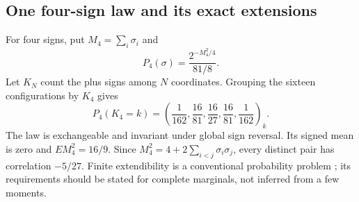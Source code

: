 \subsection{One four-sign law and its exact extensions}
\label{fin:four-law}

For four signs, put \(M_4=\sum_i\sigma_i\) and
\[
 P_4(\sigma)=\frac{2^{-M_4^2/4}}{81/8}.
\]
Let \(K_N\) count the plus signs among \(N\) coordinates.  Grouping
the sixteen configurations by \(K_4\) gives
\begin{equation}\label{fin:target}
 P_4(K_4=k)=
 \left(\frac1{162},\frac{16}{81},\frac{16}{27},
                    \frac{16}{81},\frac1{162}\right)_k .
\end{equation}
The law is exchangeable and invariant under global sign reversal.
Its signed mean is zero and \(E M_4^2=16/9\).
Since \(M_4^2=4+2\sum_{i<j}\sigma_i\sigma_j\),
every distinct pair has correlation \(-5/27\).
Finite extendibility is a conventional probability problem
\cite{fin:extendibility}; its requirements should be stated for
complete marginals, not inferred from a few moments.

